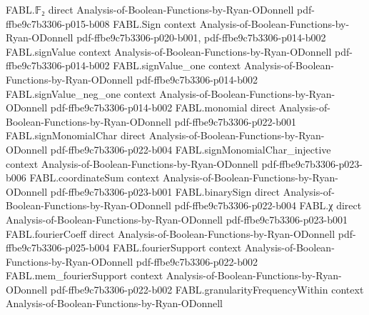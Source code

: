 \begin{theorem}
\label{FABL.vectorFourierCoeff_setIndicator_binaryAffineSubspace_ne_zero_iff}
\leanok
{}
\proofstep
  {FABL.𝔽₂}
  {direct}
  {Analysis-of-Boolean-Functions-by-Ryan-ODonnell}
  {pdf-ffbe9c7b3306-p015-b008}
\proofstep
  {FABL.Sign}
  {context}
  {Analysis-of-Boolean-Functions-by-Ryan-ODonnell}
  {pdf-ffbe9c7b3306-p020-b001,
    pdf-ffbe9c7b3306-p014-b002}
\proofstep
  {FABL.signValue}
  {context}
  {Analysis-of-Boolean-Functions-by-Ryan-ODonnell}
  {pdf-ffbe9c7b3306-p014-b002}
\proofstep
  {FABL.signValue_one}
  {context}
  {Analysis-of-Boolean-Functions-by-Ryan-ODonnell}
  {pdf-ffbe9c7b3306-p014-b002}
\proofstep
  {FABL.signValue_neg_one}
  {context}
  {Analysis-of-Boolean-Functions-by-Ryan-ODonnell}
  {pdf-ffbe9c7b3306-p014-b002}
\proofstep
  {FABL.monomial}
  {direct}
  {Analysis-of-Boolean-Functions-by-Ryan-ODonnell}
  {pdf-ffbe9c7b3306-p022-b001}
\proofstep
  {FABL.signMonomialChar}
  {direct}
  {Analysis-of-Boolean-Functions-by-Ryan-ODonnell}
  {pdf-ffbe9c7b3306-p022-b004}
\proofstep
  {FABL.signMonomialChar_injective}
  {context}
  {Analysis-of-Boolean-Functions-by-Ryan-ODonnell}
  {pdf-ffbe9c7b3306-p023-b006}
\proofstep
  {FABL.coordinateSum}
  {context}
  {Analysis-of-Boolean-Functions-by-Ryan-ODonnell}
  {pdf-ffbe9c7b3306-p023-b001}
\proofstep
  {FABL.binarySign}
  {direct}
  {Analysis-of-Boolean-Functions-by-Ryan-ODonnell}
  {pdf-ffbe9c7b3306-p022-b004}
\proofstep
  {FABL.χ}
  {direct}
  {Analysis-of-Boolean-Functions-by-Ryan-ODonnell}
  {pdf-ffbe9c7b3306-p023-b001}
\proofstep
  {FABL.fourierCoeff}
  {direct}
  {Analysis-of-Boolean-Functions-by-Ryan-ODonnell}
  {pdf-ffbe9c7b3306-p025-b004}
\proofstep
  {FABL.fourierSupport}
  {context}
  {Analysis-of-Boolean-Functions-by-Ryan-ODonnell}
  {pdf-ffbe9c7b3306-p022-b002}
\proofstep
  {FABL.mem_fourierSupport}
  {context}
  {Analysis-of-Boolean-Functions-by-Ryan-ODonnell}
  {pdf-ffbe9c7b3306-p022-b002}
\proofstep
  {FABL.granularityFrequencyWithin}
  {context}
  {Analysis-of-Boolean-Functions-by-Ryan-ODonnell}

\end{theorem}
